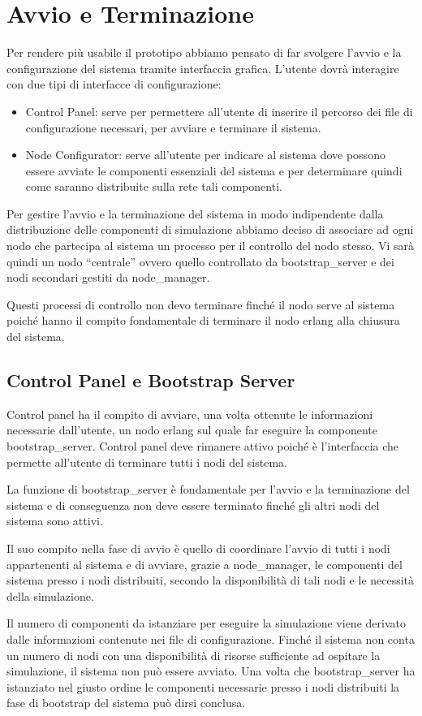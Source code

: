 \documentclass[11pt,a4paper]{report}
\begin{document}
\section{Avvio e Terminazione}
Per rendere più usabile il prototipo abbiamo pensato di far svolgere l'avvio e la configurazione del sistema tramite interfaccia grafica.
L'utente dovrà interagire con due tipi di interfacce di configurazione:
\begin{itemize}
\item Control Panel: serve per permettere all'utente di inserire il percorso dei file di configurazione necessari, per avviare e terminare il sistema.
\item Node Configurator: serve all'utente per indicare al sistema dove possono essere avviate le componenti essenziali del sistema e per determinare quindi come saranno distribuite sulla rete tali componenti.
\end{itemize}
Per gestire l'avvio e la terminazione del sistema in modo indipendente dalla distribuzione delle componenti di simulazione abbiamo deciso di associare ad ogni nodo che partecipa al sistema un processo per il controllo del nodo stesso. Vi sarà quindi un nodo ``centrale'' ovvero quello controllato da bootstrap\_server e dei nodi secondari gestiti da node\_manager.

Questi processi di controllo non devo terminare finché il nodo serve al sistema poiché hanno il compito fondamentale di terminare il nodo erlang alla chiusura del sistema.
\subsection*{Control Panel e Bootstrap Server}
Control panel ha il compito di avviare, una volta ottenute le informazioni necessarie dall'utente, un nodo erlang sul quale far eseguire la componente bootstrap\_server.
Control panel deve rimanere attivo poiché è l'interfaccia che permette all'utente di terminare tutti i nodi del sistema.

La funzione di bootstrap\_server è fondamentale per l'avvio e la terminazione del sistema e di conseguenza non deve essere terminato finché gli altri nodi del sistema sono attivi.

Il suo compito nella fase di avvio è quello di coordinare l'avvio di tutti i nodi appartenenti al sistema e di avviare, grazie a node\_manager, le componenti del sistema presso i nodi distribuiti, secondo la disponibilità di tali nodi e le necessità della simulazione.

Il numero di componenti da istanziare per eseguire la simulazione viene derivato dalle informazioni contenute nei file di configurazione. Finché il sistema non conta un numero di nodi con una disponibilità di risorse sufficiente ad ospitare la simulazione, il sistema non può essere avviato.
Una volta che bootstrap\_server ha istanziato nel giusto ordine le componenti necessarie presso i nodi distribuiti la fase di bootstrap del sistema può dirsi conclusa.
\end{document}
